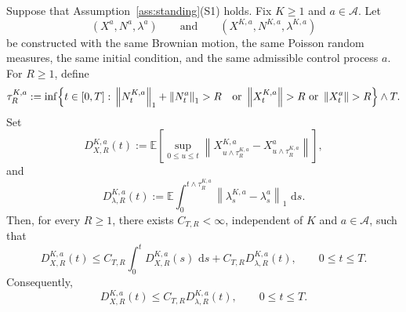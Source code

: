 \documentclass[10pt,a4paper]{amsart}
\newcommand{\E}{\mathbb E}
\newcommand{\dd}{\,\mathrm d}
\newcommand{\norm}[1]{\left\lVert #1 \right\rVert}
\begin{document}
\begin{lemma}
\label{lem:stopped_physical_stability}
Suppose that Assumption~\ref{ass:standing}(S1) holds. Fix
$K\geq1$ and $a\in\mathcal A$. Let
\[
    (X^a,N^a,\lambda^a)
    \qquad\text{and}\qquad
    (X^{K,a},N^{K,a},\lambda^{K,a})
\]
be constructed with the same Brownian motion, the same Poisson random
measures, the same initial condition, and the same admissible control
process $a$. For $R\geq1$, define
\[
\begin{aligned}
\tau_R^{K,a}
:=
\inf\Bigl\{
t\in[0,T]:\;&
\norm{N_t^{K,a}}_1+\norm{N_t^a}_1>R
&\text{or }\norm{X_t^{K,a}}>R
\text{ or }\norm{X_t^a}>R
\Bigr\}
\wedge T.
\end{aligned}
\]
Set
\[
D_{X,R}^{K,a}(t)
:=
\E\left[
    \sup_{0\leq u\leq t}
    \norm{
        X_{u\wedge\tau_R^{K,a}}^{K,a}
        -
        X_{u\wedge\tau_R^{K,a}}^a
    }
\right],
\]
and
\[
D_{\lambda,R}^{K,a}(t)
:=
\E\int_0^{t\wedge\tau_R^{K,a}}
\norm{\lambda_s^{K,a}-\lambda_s^a}_1\,\dd s.
\] Then, for every $R\geq1$, there exists
$C_{T,R}<\infty$, independent of $K$ and
$a\in\mathcal A$, such that
\begin{equation}
\label{eq:stopped_x_stability}
D_{X,R}^{K,a}(t)
\leq
C_{T,R}\int_0^tD_{X,R}^{K,a}(s)\,\dd s
+
C_{T,R}D_{\lambda,R}^{K,a}(t),
\qquad
0\leq t\leq T.
\end{equation}
Consequently,
\begin{equation}
\label{eq:stopped_x_stability_closed}
D_{X,R}^{K,a}(t)
\leq
C_{T,R}D_{\lambda,R}^{K,a}(t),
\qquad
0\leq t\leq T.
\end{equation}
\end{lemma}
\end{document}
